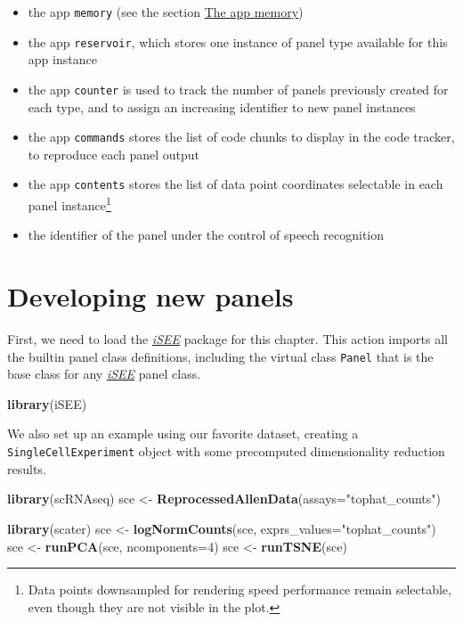 \documentclass[]{book}
\newenvironment{Shaded}{\begin{snugshade}}{\end{snugshade}}
\newcommand{\KeywordTok}[1]{\textcolor[rgb]{0.13,0.29,0.53}{\textbf{#1}}}
\newcommand{\DataTypeTok}[1]{\textcolor[rgb]{0.13,0.29,0.53}{#1}}
\newcommand{\DecValTok}[1]{\textcolor[rgb]{0.00,0.00,0.81}{#1}}
\newcommand{\StringTok}[1]{\textcolor[rgb]{0.31,0.60,0.02}{#1}}
\newcommand{\NormalTok}[1]{#1}
\providecommand{\tightlist}{%
  \setlength{\itemsep}{0pt}\setlength{\parskip}{0pt}}
\begin{document}
\begin{itemize}
\tightlist
\item
  the app \texttt{memory} (see the section
  \protect\hyperlink{memory}{The app memory})
\item
  the app \texttt{reservoir}, which stores one instance of panel type
  available for this app instance
\item
  the app \texttt{counter} is used to track the number of panels
  previously created for each type, and to assign an increasing
  identifier to new panel instances
\item
  the app \texttt{commands} stores the list of code chunks to display in
  the code tracker, to reproduce each panel output
\item
  the app \texttt{contents} stores the list of data point coordinates
  selectable in each panel instance\footnote{Data points downsampled for
    rendering speed performance remain selectable, even though they are
    not visible in the plot.} 
\item
  the identifier of the panel under the control of speech recognition
\end{itemize}

\hypertarget{developing}{\chapter{Developing new
panels}\label{developing}}

First, we need to load the
\emph{\href{https://bioconductor.org/packages/3.11/iSEE}{iSEE}} package
for this chapter. This action imports all the builtin panel class
definitions, including the virtual class \texttt{Panel} that is the base
class for any
\emph{\href{https://bioconductor.org/packages/3.11/iSEE}{iSEE}} panel
class.

\begin{Shaded}
\begin{Highlighting}[]
\KeywordTok{library}\NormalTok{(iSEE)}
\end{Highlighting}
\end{Shaded}

We also set up an example using our favorite dataset, creating a
\texttt{SingleCellExperiment} object with some precomputed
dimensionality reduction results.

\begin{Shaded}
\begin{Highlighting}[]
\KeywordTok{library}\NormalTok{(scRNAseq)}
\NormalTok{sce <-}\StringTok{ }\KeywordTok{ReprocessedAllenData}\NormalTok{(}\DataTypeTok{assays=}\StringTok{"tophat_counts"}\NormalTok{)}

\KeywordTok{library}\NormalTok{(scater)}
\NormalTok{sce <-}\StringTok{ }\KeywordTok{logNormCounts}\NormalTok{(sce, }\DataTypeTok{exprs_values=}\StringTok{"tophat_counts"}\NormalTok{)}
\NormalTok{sce <-}\StringTok{ }\KeywordTok{runPCA}\NormalTok{(sce, }\DataTypeTok{ncomponents=}\DecValTok{4}\NormalTok{)}
\NormalTok{sce <-}\StringTok{ }\KeywordTok{runTSNE}\NormalTok{(sce)}
\end{Highlighting}
\end{Shaded}
\end{document}
